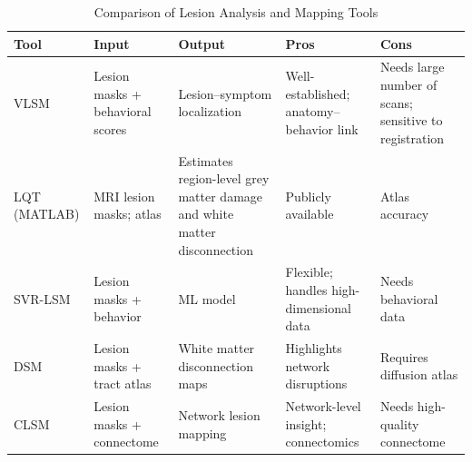 \documentclass{article}
\begin{document}
\begin{table}[htbp]
\centering
\small %
\setlength{\tabcolsep}{4pt} %
\renewcommand{\arraystretch}{1.1} %
\caption{Comparison of Lesion Analysis and Mapping Tools}
\begin{tabular}{|p{2.8cm}|p{2.8cm}|p{2.8cm}|p{2.8cm}|p{2.8cm}|}
\hline
\textbf{Tool} & \textbf{Input} & \textbf{Output} & \textbf{Pros} & \textbf{Cons} \\
\hline
VLSM & Lesion masks + behavioral scores & Lesion–symptom localization & Well-established; anatomy–behavior link & Needs large number of scans; sensitive to registration \\
\hline
LQT (MATLAB) & MRI lesion masks; atlas & Estimates region-level grey matter damage and white matter disconnection & Publicly available & Atlas accuracy  \\
\hline
SVR-LSM & Lesion masks + behavior & ML model & Flexible; handles high-dimensional data & Needs behavioral data \\
\hline
DSM & Lesion masks + tract atlas & White matter disconnection maps & Highlights network disruptions & Requires diffusion atlas  \\
\hline
CLSM & Lesion masks + connectome & Network lesion mapping & Network-level insight; connectomics & Needs high-quality connectome \\
\hline
\end{tabular}
\end{table}
\end{document}
